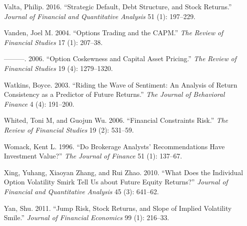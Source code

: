 \documentclass[
  letterpaper,
  DIV=11,
  numbers=noendperiod]{scrreprt}
\newlength{\cslhangindent}
\newlength{\cslentryspacingunit} %
\newenvironment{CSLReferences}[2] %
 {%
  \setlength{\parindent}{0pt}
  \ifodd #1
  \let\oldpar\par
  \def\par{\hangindent=\cslhangindent\oldpar}
  \fi
  \setlength{\parskip}{#2\cslentryspacingunit}
 }%
 {}
\begin{document}
\begin{CSLReferences}{1}{0}
\leavevmode{}%
Valta, Philip. 2016. {``Strategic Default, Debt Structure, and Stock
Returns.''} \emph{Journal of Financial and Quantitative Analysis} 51
(1): 197--229.

\leavevmode{}%
Vanden, Joel M. 2004. {``Options Trading and the CAPM.''} \emph{The
Review of Financial Studies} 17 (1): 207--38.

\leavevmode{}%
---------. 2006. {``Option Coskewness and Capital Asset Pricing.''}
\emph{The Review of Financial Studies} 19 (4): 1279--1320.

\leavevmode{}%
Watkins, Boyce. 2003. {``Riding the Wave of Sentiment: An Analysis of
Return Consistency as a Predictor of Future Returns.''} \emph{The
Journal of Behavioral Finance} 4 (4): 191--200.

\leavevmode{}%
Whited, Toni M, and Guojun Wu. 2006. {``Financial Constraints Risk.''}
\emph{The Review of Financial Studies} 19 (2): 531--59.

\leavevmode{}%
Womack, Kent L. 1996. {``Do Brokerage Analysts' Recommendations Have
Investment Value?''} \emph{The Journal of Finance} 51 (1): 137--67.

\leavevmode{}%
Xing, Yuhang, Xiaoyan Zhang, and Rui Zhao. 2010. {``What Does the
Individual Option Volatility Smirk Tell Us about Future Equity
Returns?''} \emph{Journal of Financial and Quantitative Analysis} 45
(3): 641--62.

\leavevmode{}%
Yan, Shu. 2011. {``Jump Risk, Stock Returns, and Slope of Implied
Volatility Smile.''} \emph{Journal of Financial Economics} 99 (1):
216--33.

\end{CSLReferences}
\end{document}
